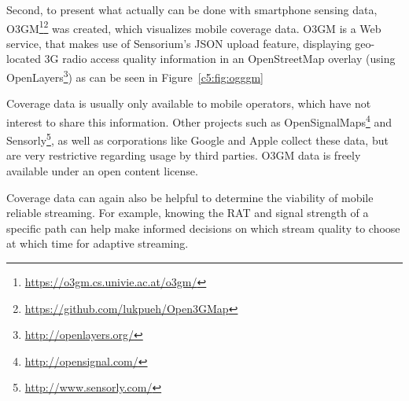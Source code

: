 Second, to present what actually can be done with smartphone sensing data, \gls{O3GM}\footnote{\url{https://o3gm.cs.univie.ac.at/o3gm/}}\footnote{\url{https://github.com/lukpueh/Open3GMap}} was created, which visualizes mobile coverage data. \gls{O3GM} is a Web service, that makes use of Sensorium's \acrshort{JSON} upload feature, displaying geo-located \gls{3G} radio access quality information in an OpenStreetMap overlay (using OpenLayers\footnote{\url{http://openlayers.org/}}) as can be seen in Figure~\ref{c5:fig:ogggm}

Coverage data is usually only available to mobile operators, which have not interest to share this information. Other projects such as OpenSignalMaps\footnote{\url{http://opensignal.com/}} and Sensorly\footnote{\url{http://www.sensorly.com/}}, as well as corporations like Google and Apple collect these data, but are very restrictive regarding usage by third parties. \gls{O3GM} data is freely available under an open content license.

Coverage data can again also be helpful to determine the viability of mobile reliable streaming. For example, knowing the \gls{RAT} and signal strength of a specific path can help make informed decisions on which stream quality to choose at which time for adaptive streaming.












